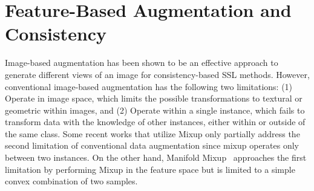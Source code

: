 \documentclass[runningheads]{llncs}
\begin{document}
 \begin{table*}[t]
\centering
\renewcommand{\arraystretch}{1.2}
\caption{
Comparison to other SSL methods with consistency regularization.
}
\label{table:method-comparison}
\end{table*} 
\section{Feature-Based Augmentation and Consistency} \label{section:method}
Image-based augmentation has been shown to be an effective approach to generate different views of an image for consistency-based SSL methods.
However, conventional image-based augmentation has the following two limitations: (1) Operate in image space, which limits the possible transformations to textural or geometric within images, and (2) Operate within a single instance, which fails to transform data with the knowledge of other instances, either within or outside of the same class.
Some recent works that utilize Mixup only partially address the second limitation of conventional data augmentation since mixup operates only between two instances.
On the other hand, Manifold Mixup~\cite{verma2018manifold} approaches the first limitation by performing Mixup in the feature space but is limited to a simple convex combination of two samples.
\end{document}

